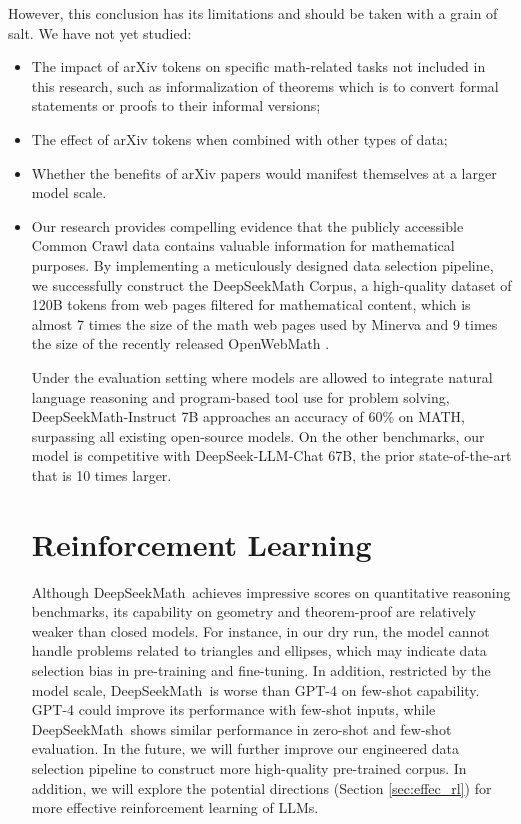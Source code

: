 However, this conclusion has its limitations and should be taken with a grain of salt. We have not yet studied:

\begin{itemize}[topsep=0pt]
    \item The impact of arXiv tokens on specific math-related tasks not included in this research, such as informalization of theorems which is to convert formal statements or proofs to their informal versions;
    \item The effect of arXiv tokens when combined with other types of data;
    \item Whether the benefits of arXiv papers would manifest themselves at a larger model scale.
\end{itemize}

\begin{itemize}[topsep=0pt]
    \item Our research provides compelling evidence that the publicly accessible Common Crawl data contains valuable information for mathematical purposes. By implementing a meticulously designed data selection pipeline, we successfully construct the DeepSeekMath Corpus, a high-quality dataset of 120B tokens from web pages filtered for mathematical content, which is almost 7 times the size of the math web pages used by Minerva \citep{minerva} and 9 times the size of the recently released OpenWebMath \citep{openwebmath}.

Under the evaluation setting where models are allowed to integrate natural language reasoning and program-based tool use for problem solving, DeepSeekMath-Instruct 7B approaches an accuracy of 60\% on MATH, surpassing all existing open-source models. On the other benchmarks, our model is competitive with DeepSeek-LLM-Chat 67B, the prior state-of-the-art that is 10 times larger.
\section{Reinforcement Learning}

Although DeepSeekMath~achieves impressive scores on quantitative reasoning benchmarks, its capability on geometry and theorem-proof are relatively weaker than closed models. For instance, in our dry run, the model cannot handle problems related to triangles and ellipses, which may indicate data selection bias in pre-training and fine-tuning. In addition, restricted by the model scale, DeepSeekMath~is worse than GPT-4 on few-shot capability. GPT-4 could improve its performance with few-shot inputs, while DeepSeekMath~shows similar performance in zero-shot and few-shot evaluation. In the future, we will further improve our engineered data selection pipeline to construct more high-quality pre-trained corpus. In addition, we will explore the potential directions (Section \ref{sec:effec_rl}) for more effective reinforcement learning of LLMs.


\end{itemize}
